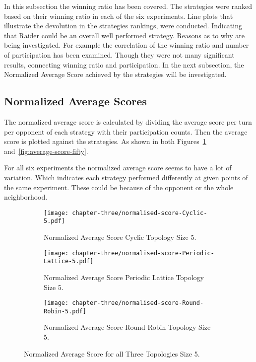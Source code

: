 In this subsection the winning ratio has been covered. The strategies were ranked
based on their winning ratio in each of the
six experiments. Line plots that illustrate the devolution in the strategies
rankings, were conducted. Indicating that Raider could be an overall well performed
strategy. Reasons as to why are being investigated. For example the correlation
of the winning ratio and number of participation has been examined. Though
they were not many significant results, connecting winning ratio and participation.
In the next subsection, the Normalized Average Score achieved by the strategies
will be investigated.

\subsection{Normalized Average Scores}
\label{sub:normalized_av_score}

The normalized average score is calculated by dividing the average score per
turn per opponent
of each strategy with their participation counts. Then the average score
is plotted against the strategies. As shown in both
Figures~\ref{fig:average-score-five} and~\ref{fig:average-score-fifty}.

For all six experiments the normalized average score seems to have a lot
of variation. Which indicates each strategy performed differently at given
points of the same experiment. These could be because of the opponent or the
whole neighborhood.

\begin{figure}[H]
\centering
    \begin{subfigure}[t]{0.8\textwidth}
    \centering
        \texttt{[image: chapter-three/normalised-score-Cyclic-5.pdf]}
    \caption{Normalized Average Score Cyclic Topology Size 5.}
    \end{subfigure}
\hfill
    \begin{subfigure}[t]{0.8\textwidth}\centering
    \centering
        \texttt{[image: chapter-three/normalised-score-Periodic-Lattice-5.pdf]}
    \caption{Normalized Average Score Periodic Lattice Topology Size 5.}
    \end{subfigure}
\hfill
    \begin{subfigure}[t]{0.8\textwidth}\centering
    \centering
        \texttt{[image: chapter-three/normalised-score-Round-Robin-5.pdf]}
    \caption{Normalized Average Score Round Robin Topology Size 5.}
    \end{subfigure}
\caption{Normalized Average Score for all Three Topologies Size 5.}
\label{fig:average-score-five}
\end{figure}

